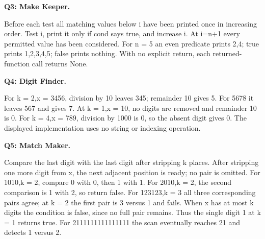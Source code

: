 \documentclass[10pt]{scrartcl}
\begin{document}
\begin{prob}
\textbf{Q3: Make Keeper.} 
\begin{steps}
\ii Before each test all matching values below i have been printed once in increasing order. Test i, print it only if cond says true, and increase i.
\ii At i=n+1 every permitted value has been considered. For n = 5 an even predicate prints 2,4; true prints 1,2,3,4,5; false prints nothing. With no explicit return, each returned-function call returns None.
\end{steps}
\end{prob}
\begin{prob}
\textbf{Q4: Digit Finder.} 
\begin{steps}
\ii For k = 2,x = 3456, division by 10 leaves 345; remainder 10 gives 5. For 5678 it leaves 567 and gives 7.
\ii At k = 1,x = 10, no digits are removed and remainder 10 is 0. For k = 4,x = 789, division by 1000 is 0, so the absent digit gives 0. The displayed implementation uses no string or indexing operation.
\end{steps}
\end{prob}
\begin{prob}
\textbf{Q5: Match Maker.} 
\begin{steps}
\ii Compare the last digit with the last digit after stripping k places. After stripping one more digit from x, the next adjacent position is ready; no pair is omitted.
\ii For 1010,k = 2, compare 0 with 0, then 1 with 1. For 2010,k = 2, the second comparison is 1 with 2, so return false. For 123123,k = 3 all three corresponding pairs agree; at k = 2 the first pair is 3 versus 1 and fails.
\ii When x has at most k digits the condition is false, since no full pair remains. Thus the single digit 1 at k = 1 returns true. For 2111111111111111 the scan eventually reaches 21 and detects 1 versus 2.
\end{steps}
\end{prob}
\end{document}
